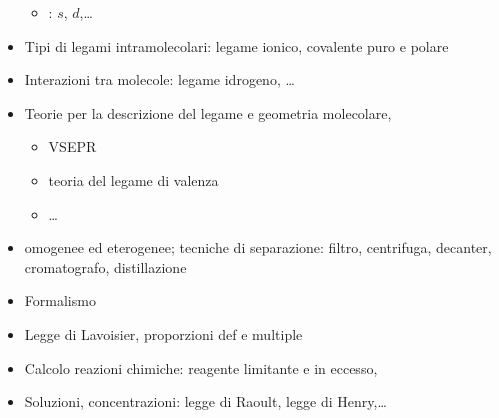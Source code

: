 \documentclass[letterpaper,10pt,english]{jupyterBook}
\begin{document}
\begin{itemize}
\begin{itemize}
\item {} 
\sphinxAtStartPar
{}: \(s\), \(d\),…

\end{itemize}

\item {} 
\sphinxAtStartPar
Tipi di legami intramolecolari: legame ionico, covalente puro e polare

\item {} 
\sphinxAtStartPar
Interazioni tra molecole: legame idrogeno, … 

\item {} 
\sphinxAtStartPar
Teorie per la descrizione del legame e geometria molecolare,
\begin{itemize}
\item {} 
\sphinxAtStartPar
VSEPR

\item {} 
\sphinxAtStartPar
teoria del legame di valenza

\item {} 
\sphinxAtStartPar
…

\end{itemize}

\end{itemize}

\sphinxAtStartPar
{}
\begin{itemize}
\item {} 
\sphinxAtStartPar
omogenee ed eterogenee; tecniche di separazione: filtro, centrifuga, decanter, cromatografo, distillazione

\end{itemize}

\sphinxAtStartPar
{}
\begin{itemize}
\item {} 
\sphinxAtStartPar
Formalismo

\item {} 
\sphinxAtStartPar
Legge di Lavoisier, proporzioni def e multiple

\item {} 
\sphinxAtStartPar
Calcolo reazioni chimiche: reagente limitante e in eccesso,

\item {} 
\sphinxAtStartPar
Soluzioni, concentrazioni: legge di Raoult, legge di Henry,…

\end{itemize}
\end{document}
